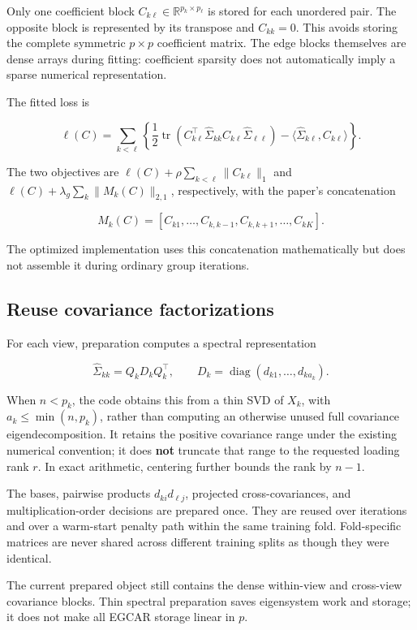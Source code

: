 \documentclass[
  11pt,
]{article}
\begin{document}
Only one coefficient block \(C_{k\ell}\in\mathbb R^{p_k\times p_\ell}\)
is stored for each unordered pair. The opposite block is represented by
its transpose and \(C_{kk}=0\). This avoids storing the complete
symmetric \(p\times p\) coefficient matrix. The edge blocks themselves
are dense arrays during fitting: coefficient sparsity does not
automatically imply a sparse numerical representation.

The fitted loss is

\[
\ell(C)=\sum_{k<\ell}\left\{
\frac12\operatorname{tr}(C_{k\ell}^\top\widehat\Sigma_{kk}
 C_{k\ell}\widehat\Sigma_{\ell\ell})
-\langle\widehat\Sigma_{k\ell},C_{k\ell}\rangle\right\}.
\]

The two objectives are \(\ell(C)+\rho\sum_{k<\ell}\|C_{k\ell}\|_1\) and
\(\ell(C)+\lambda_g\sum_k\|M_k(C)\|_{2,1}\), respectively, with the
paper's concatenation

\[
M_k(C)=[C_{k1},\ldots,C_{k,k-1},C_{k,k+1},\ldots,C_{kK}].
\]

The optimized implementation uses this concatenation mathematically but
does not assemble it during ordinary group iterations.

\hypertarget{reuse-covariance-factorizations}{%
\subsection{Reuse covariance
factorizations}\label{reuse-covariance-factorizations}}

For each view, preparation computes a spectral representation

\[
\widehat\Sigma_{kk}=Q_kD_kQ_k^\top,
\qquad D_k=\operatorname{diag}(d_{k1},\ldots,d_{ka_k}).
\]

When \(n<p_k\), the code obtains this from a thin SVD of \(X_k\), with
\(a_k\leq\min(n,p_k)\), rather than computing an otherwise unused full
covariance eigendecomposition. It retains the positive covariance range
under the existing numerical convention; it does \textbf{not} truncate
that range to the requested loading rank \(r\). In exact arithmetic,
centering further bounds the rank by \(n-1\).

The bases, pairwise products \(d_{ki}d_{\ell j}\), projected
cross-covariances, and multiplication-order decisions are prepared once.
They are reused over iterations and over a warm-start penalty path
within the same training fold. Fold-specific matrices are never shared
across different training splits as though they were identical.

The current prepared object still contains the dense within-view and
cross-view covariance blocks. Thin spectral preparation saves
eigensystem work and storage; it does not make all EGCAR storage linear
in \(p\).
\end{document}
